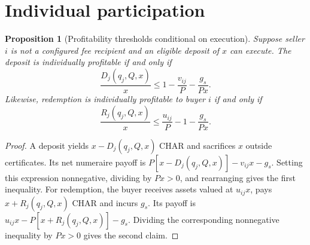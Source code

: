 \documentclass[11pt]{article}
\newtheorem{proposition}{Proposition}
\begin{document}
\section{Individual participation}
\begin{proposition}[Profitability thresholds conditional on execution]
\label{prop:participation}
Suppose seller $i$ is not a configured fee recipient and an eligible deposit of $x$ can execute. The deposit is individually profitable if and only if
\begin{equation}
\frac{D_j(q_j,Q,x)}{x}\le 1-\frac{v_{ij}}{P}-\frac{g_s}{Px}.
\end{equation}
Likewise, redemption is individually profitable to buyer $i$ if and only if
\begin{equation}
\frac{R_j(q_j,Q,x)}{x}\le\frac{u_{ij}}{P}-1-\frac{g_s}{Px}.
\end{equation}
\end{proposition}
\begin{proof}
A deposit yields $x-D_j(q_j,Q,x)$ CHAR and sacrifices $x$ outside certificates. Its net numeraire payoff is $P[x-D_j(q_j,Q,x)]-v_{ij}x-g_s$. Setting this expression nonnegative, dividing by $Px>0$, and rearranging gives the first inequality. For redemption, the buyer receives assets valued at $u_{ij}x$, pays $x+R_j(q_j,Q,x)$ CHAR and incurs $g_s$. Its payoff is $u_{ij}x-P[x+R_j(q_j,Q,x)]-g_s$. Dividing the corresponding nonnegative inequality by $Px>0$ gives the second claim.
\end{proof}
\end{document}

